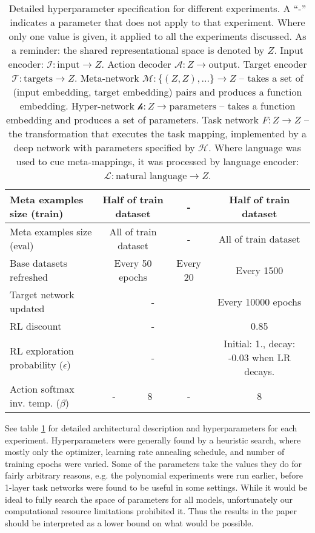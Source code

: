 \begin{table}
\begin{tabular}{|p{4cm}||c|c|c|c|}
Meta examples size (train) & \multicolumn{2}{c|}{Half of train dataset} & - & Half of train dataset \\\hline
Meta examples size (eval) & \multicolumn{2}{c|}{All of train dataset} & - & All of train dataset \\\hline
Base datasets refreshed & \multicolumn{2}{c|}{Every 50 epochs} & Every 20 & Every 1500  \\\hline
Target network updated & \multicolumn{3}{c|}{-} & Every 10000 epochs  \\\hline
RL discount & \multicolumn{3}{c|}{-} & 0.85 \\\hline
RL exploration probability (\(\epsilon\)) & \multicolumn{3}{c|}{-} & \multicolumn{1}{p{2.3cm}|}{Initial: 1., decay: -0.03 when LR decays.}\\\hline
Action softmax inv. temp. (\(\beta\)) & - & 8 & - & 8\\\hline
\end{tabular}
\caption{Detailed hyperparameter specification for different experiments. A ``-'' indicates a parameter that does not apply to that experiment. Where only one value is given, it applied to all the experiments discussed. As a reminder: the shared representational space is denoted by $Z$. Input encoder: $\mathcal{I}: \text{input} \rightarrow Z$. Action decoder $\mathcal{A}: Z \rightarrow \text{output}$. Target encoder $\mathcal{T}: \text{targets} \rightarrow Z$. Meta-network $\mathcal{M}: \{(Z, Z), ...\} \rightarrow Z $ -- takes a set of (input embedding, target embedding) pairs and produces a function embedding. Hyper-network $\mathcal{h}: Z \rightarrow \text{parameters}$ -- takes a function embedding and produces a set of parameters. Task network $F: Z \rightarrow Z$ -- the transformation that executes the task mapping, implemented by a deep network with parameters specified by $\mathcal{H}$. Where language was used to cue meta-mappings, it was processed by language encoder: $\mathcal{L}: \text{natural language} \rightarrow Z$. } \label{supp_hyperparameter_table}
\end{table}
See table \ref{supp_hyperparameter_table} for detailed architectural description and hyperparameters for each experiment. Hyperparameters were generally found by a heuristic search, where mostly only the optimizer, learning rate annealing schedule, and number of training epochs were varied. Some of the parameters take the values they do for fairly arbitrary reasons, e.g. the polynomial experiments were run earlier, before 1-layer task networks were found to be useful in some settings. While it would be ideal to fully search the space of parameters for all models, unfortunately our computational resource limitations prohibited it. Thus the results in the paper should be interpreted as a lower bound on what would be possible. \par
